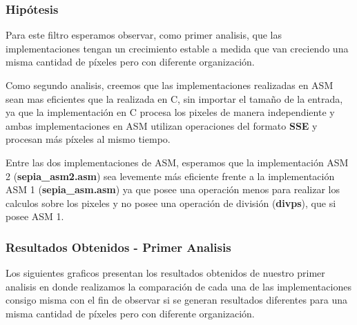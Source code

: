 \subsubsection{Hipótesis}

Para este filtro esperamos observar, como primer analisis, que las implementaciones tengan un crecimiento estable a medida que van creciendo una misma cantidad de píxeles pero con diferente organización.

Como segundo analisis, creemos que las implementaciones realizadas en ASM sean mas eficientes que la realizada en C, sin importar el tamaño de la entrada, ya que la implementación en C procesa los pixeles de manera independiente y ambas implementaciones en ASM utilizan operaciones del formato \textbf{SSE} y procesan más píxeles al mismo tiempo.

Entre las dos implementaciones de ASM, esperamos que la implementación ASM 2 (\textbf{sepia_asm2.asm}) sea levemente más eficiente frente a la implementación ASM 1 (\textbf{sepia_asm.asm}) ya que posee una operación menos para realizar los calculos sobre los pixeles y no posee una operación de división (\textbf{divps}), que si posee ASM 1.

\subsubsection{Resultados Obtenidos - Primer Analisis}

Los siguientes graficos presentan los resultados obtenidos de nuestro primer analisis en donde realizamos la comparación de cada una de las implementaciones consigo misma con el fin de observar si se generan resultados diferentes para una misma cantidad de píxeles pero con diferente organización.

